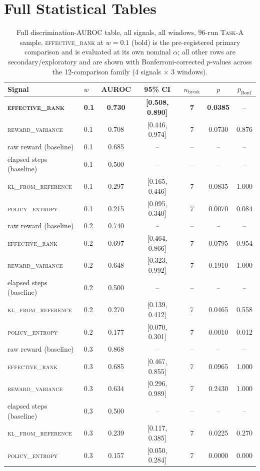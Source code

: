 \documentclass{article}
\newcommand{\taskA}{\textsc{Task-A}}
\newcommand{\erank}{\textsc{effective\_rank}}
\newcommand{\pentropy}{\textsc{policy\_entropy}}
\newcommand{\klref}{\textsc{kl\_from\_reference}}
\newcommand{\rvar}{\textsc{reward\_variance}}
\begin{document}
\section{Full Statistical Tables}
\label{app:full-tables}

\begin{table}[h]
\centering
\caption{Full discrimination-AUROC table, all signals, all windows, 96-run
\taskA{} sample. \erank{} at $w{=}0.1$ (bold) is the pre-registered primary
comparison and is evaluated at its own nominal $\alpha$; all other rows are
secondary/exploratory and are shown with Bonferroni-corrected $p$-values
across the 12-comparison family (4 signals $\times$ 3 windows).}
\label{tab:full-auroc}
\begin{tabular}{llccccc}
\toprule
Signal & $w$ & AUROC & 95\% CI & $n_{\text{break}}$ & $p$ & $p_{\text{Bonf}}$ \\
\midrule
\textbf{\erank} & \textbf{0.1} & \textbf{0.730} & \textbf{[0.508, 0.890]} & \textbf{7} & \textbf{0.0385} & \textbf{--} \\
\rvar & 0.1 & 0.708 & [0.446, 0.974] & 7 & 0.0730 & 0.876 \\
raw reward (baseline) & 0.1 & 0.685 & -- & -- & -- & -- \\
elapsed steps (baseline) & 0.1 & 0.500 & -- & -- & -- & -- \\
\klref & 0.1 & 0.297 & [0.165, 0.446] & 7 & 0.0835 & 1.000 \\
\pentropy & 0.1 & 0.215 & [0.095, 0.340] & 7 & 0.0070 & 0.084 \\
\midrule
raw reward (baseline) & 0.2 & 0.740 & -- & -- & -- & -- \\
\erank & 0.2 & 0.697 & [0.464, 0.866] & 7 & 0.0795 & 0.954 \\
\rvar & 0.2 & 0.648 & [0.323, 0.992] & 7 & 0.1910 & 1.000 \\
elapsed steps (baseline) & 0.2 & 0.500 & -- & -- & -- & -- \\
\klref & 0.2 & 0.270 & [0.139, 0.412] & 7 & 0.0465 & 0.558 \\
\pentropy & 0.2 & 0.177 & [0.070, 0.301] & 7 & 0.0010 & 0.012 \\
\midrule
raw reward (baseline) & 0.3 & 0.868 & -- & -- & -- & -- \\
\erank & 0.3 & 0.685 & [0.467, 0.855] & 7 & 0.0965 & 1.000 \\
\rvar & 0.3 & 0.634 & [0.296, 0.989] & 7 & 0.2430 & 1.000 \\
elapsed steps (baseline) & 0.3 & 0.500 & -- & -- & -- & -- \\
\klref & 0.3 & 0.239 & [0.117, 0.385] & 7 & 0.0225 & 0.270 \\
\pentropy & 0.3 & 0.157 & [0.050, 0.284] & 7 & 0.0000 & 0.000 \\
\bottomrule
\end{tabular}
\end{table}
\end{document}
